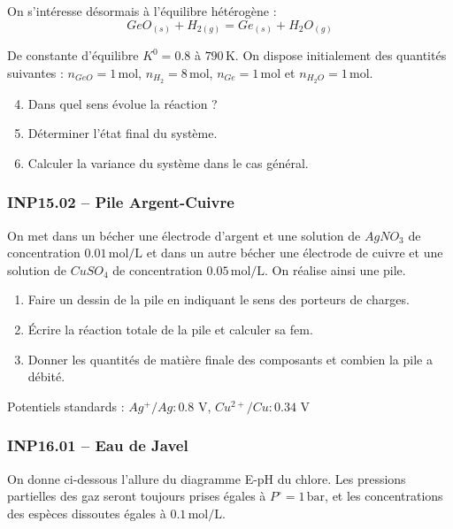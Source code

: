 On s'intéresse désormais à l'équilibre hétérogène :
\[
GeO_{(s)} + H_{2(g)} = Ge_{(s)} + H_2O_{(g)}
\]

De constante d'équilibre $K^0 = 0.8$ à $790\, \text{K}$. On dispose initialement des quantités suivantes : $n_{GeO} = 1\, \text{mol}$, $n_{H_2} = 8\, \text{mol}$, $n_{Ge} = 1\, \text{mol}$ et $n_{H_2O} = 1\, \text{mol}$.

\begin{enumerate}
    \setcounter{enumi}{3}
    \item Dans quel sens évolue la réaction ?
    \item Déterminer l'état final du système.
    \item Calculer la variance du système dans le cas général.
\end{enumerate}

\newpage
\subsubsection*{INP15.02 -- Pile Argent-Cuivre}

On met dans un bécher une électrode d'argent et une solution de $AgNO_3$ de concentration $0.01\, \text{mol/L}$ et dans un autre bécher une électrode de cuivre et une solution de $CuSO_4$ de concentration $0.05\, \text{mol/L}$. On réalise ainsi une pile.

\begin{enumerate}
    \item Faire un dessin de la pile en indiquant le sens des porteurs de charges.
    \item Écrire la réaction totale de la pile et calculer sa fem.
    \item Donner les quantités de matière finale des composants et combien la pile a débité.
\end{enumerate}

Potentiels standards : $Ag^+/Ag : 0.8\text{ V}$, $Cu^{2+}/Cu : 0.34\text{ V}$

\subsubsection*{INP16.01 -- Eau de Javel  \lesdeux}

On donne ci-dessous l'allure du diagramme E-pH du chlore. Les pressions partielles des gaz seront toujours prises égales à $P^\circ = 1\, \text{bar}$, et les concentrations des espèces dissoutes égales à $0.1\, \text{mol/L}$.
\begin{center}
\end{center}

